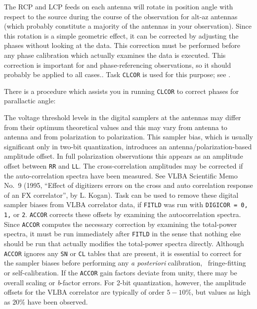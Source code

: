 The RCP and LCP feeds on each antenna will rotate in position angle
with respect to the source during the course of the observation for
alt-az antennas (which probably constitute a majority of the antennas
in your observation).  Since this rotation is a simple geometric
effect, it can be corrected by adjusting the phases without looking at
the data.  This correction must be performed before any phase
calibration which actually examines the data is executed.  This
correction is important for  and phase-referencing
observations, so it should probably be applied to all cases..  Task
{\tt CLCOR} is used for this purpose; see .

There is a procedure which assists you in running {\tt CLCOR} to
correct phases for parallactic angle:


The voltage threshold levels in the digital samplers at the antennas
may differ from their optimum theoretical values and this may vary
from antenna to antenna and from polarization to polarization.  This
sampler bias, which is usually significant only in two-bit
quantization, introduces an antenna/polarization-based amplitude
offset.  In full polarization observations this appears as an
amplitude offset between {\tt RR} and {\tt LL}\@.  The
cross-correlation amplitudes may be corrected if the auto-correlation
spectra have been measured.  See VLBA Scientific Memo No.~9 (1995,
``Effect of digitizers errors on the cross and auto correlation
response of an FX correlator'', by L. Kogan).  Task {\tt {}}
can be used to remove these digital sampler biases from VLBA
correlator data, if {\tt FITLD} was run with {\tt DIGICOR = 0, 1,} or
{\tt 2}.   {\tt ACCOR} corrects these offsets by examining the
autocorrelation spectra. Since {\tt ACCOR} computes the necessary correction
by examining the total-power spectra, it must be run immediately after
{\tt FITLD} in the sense that nothing else should be run that actually
modifies the total-power spectra directly.  Although {\tt ACCOR}
ignores any {\tt SN} or {\tt CL} tables that are present, it is
essential to correct for the sampler biases before performing any {\it
a posteriori\/} calibration, \eg\ fringe-fitting or self-calibration.
If the {\tt ACCOR} gain factors deviate from unity, there may be overall
scaling or {\it b\/}-factor errors.  For 2-bit quantization, however,
the amplitude offsets for the VLBA correlator are typically of order
$5-10\%$, but values as high as $20\%$ have been observed.

